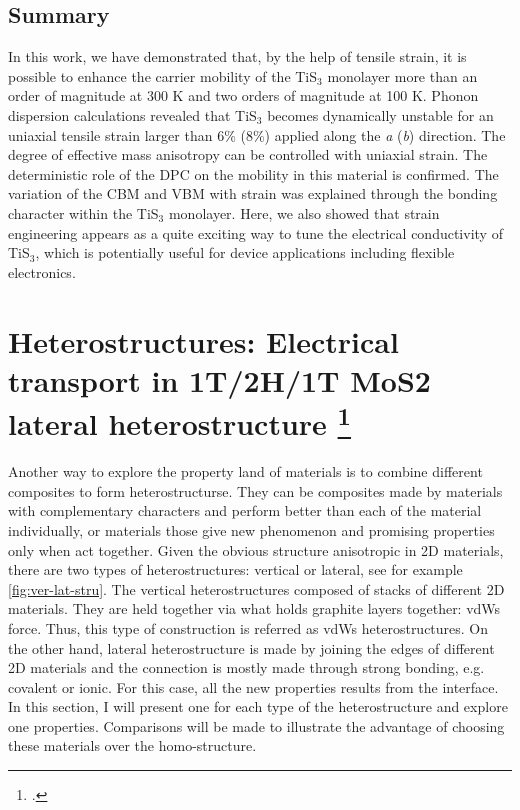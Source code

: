 \subsection{Summary}

In this work, we have demonstrated that, by the help of tensile strain, it is possible to enhance the carrier mobility of the TiS$_3$ monolayer more than an order of magnitude at 300 K and two orders of magnitude at 100 K. Phonon dispersion calculations revealed that TiS$_3$ becomes dynamically unstable for an uniaxial tensile strain larger than 6\% (8\%) applied along the \textit{a} (\textit{b}) direction. The degree of effective mass anisotropy can be controlled with uniaxial strain. The deterministic role of the DPC on the mobility in this material is confirmed. The variation of the CBM and VBM with strain was explained through the bonding character within the TiS$_3$ monolayer.  Here, we also showed that strain engineering appears as a quite exciting way to tune the electrical conductivity of TiS$_3$, which is potentially useful for device applications including flexible electronics.

\section[Heterostructures: Electrical transport in 1T/2H/1T MoS2 lateral heterostructure]{Heterostructures: Electrical transport in 1T/2H/1T MoS2 lateral heterostructure \footcite[This work is submitted as:][]{Aierken2017.transport} \label{trans_mx2}}

Another way to explore the property land of materials is to combine different composites to form heterostructurse\cite{Geim_Grigorieva_2013,Liu2016b,Pomerantseva2017}. They can be composites made by materials with complementary characters and perform better than each of the material individually, or materials those give new phenomenon and promising properties only when act together.  Given the obvious structure anisotropic in 2D materials, there are two types of heterostructures: vertical or lateral, see for example \autoref{fig:ver-lat-stru}. The vertical heterostructures composed of stacks of different 2D materials. They are held together via what holds graphite layers together: vdWs force. Thus, this type of construction is referred as vdWs heterostructures.  On the other hand, lateral heterostructure\cite{Jena2014,Chhowalla2015} is made by joining the edges of different 2D materials and the connection is mostly made through strong bonding, e.g. covalent or ionic. For this case, all the new properties results from the interface. In this section, I will present one for each type of the heterostructure and explore one properties. Comparisons will be made to illustrate the advantage of choosing these materials over the homo-structure. 

